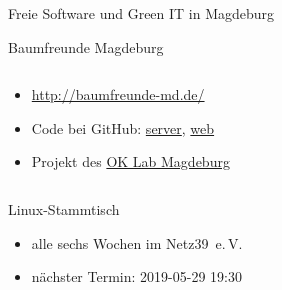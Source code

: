 \documentclass[t]{beamer}
\begin{document}
\begin{frame}{Freie Software und Green IT in Magdeburg}
    \begin{block}{Baumfreunde Magdeburg}
        \begin{columns}[T]
            \begin{column}{0.65\textwidth}
                \begin{itemize}
                    \item \url{http://baumfreunde-md.de/}
                    \item Code bei GitHub:
                        \href{https://github.com/code-for-magdeburg/baumfreunde-md-server}{server},
                        \href{https://github.com/code-for-magdeburg/baumfreunde-md-web}{web}
                    \item Projekt des \href{https://codefor.de/magdeburg/}{OK Lab Magdeburg}
                \end{itemize}
            \end{column}
            \begin{column}{0.3\textwidth}
            \end{column}
        \end{columns}
    \end{block}

    \begin{columns}[T]
        \begin{column}{0.65\textwidth}
    \begin{block}{Linux-Stammtisch}
        \begin{itemize}
            \item alle sechs Wochen im Netz39~e.\,V.
            \item nächster Termin: 2019-05-29 19:30
        \end{itemize}
    \end{block}
        \end{column}
        \begin{column}{0.3\textwidth}
            
        \end{column}
    \end{columns}


\end{frame}
\end{document}
